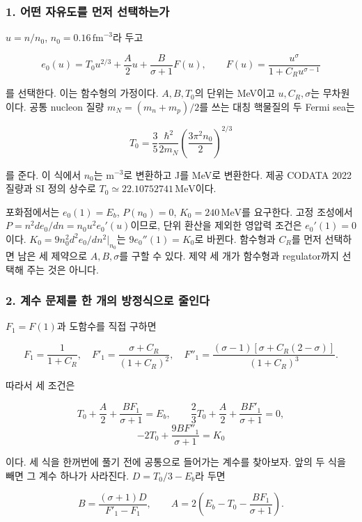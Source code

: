 \documentclass[
  10pt,
  a4paper,
]{article}
\begin{document}
\subsubsection{1. 어떤 자유도를 먼저
선택하는가}\label{uxc5b4uxb5a4-uxc790uxc720uxb3c4uxb97c-uxba3cuxc800-uxc120uxd0dduxd558uxb294uxac00}

\(u=n/n_0\), \(n_0=0.16\,\mathrm{fm}^{-3}\)라 두고

\[
e_0(u)=T_0u^{2/3}+\frac A2u+\frac{B}{\sigma+1}F(u),
\qquad F(u)=\frac{u^\sigma}{1+C_Ru^{\sigma-1}}
\]

를 선택한다. 이는 함수형의 가정이다. \(A,B,T_0\)의 단위는 MeV이고
\(u,C_R,\sigma\)는 무차원이다. 공통 nucleon 질량 \(m_N=(m_n+m_p)/2\)를
쓰는 대칭 핵물질의 두 Fermi sea는

\[
T_0=\frac35\frac{\hbar^2}{2m_N}
\left(\frac{3\pi^2 n_0}{2}\right)^{2/3}
\]

를 준다. 이 식에서 \(n_0\)는 \(\mathrm{m}^{-3}\)로 변환하고 J를 MeV로
변환한다. 제공 CODATA 2022 질량과 SI 정의 상수로
\(T_0\simeq22.10752741\,\mathrm{MeV}\)이다.

포화점에서는 \(e_0(1)=E_b\), \(P(n_0)=0\), \(K_0=240\,\mathrm{MeV}\)를
요구한다. 고정 조성에서 \(P=n^2de_0/dn=n_0u^2e_0'(u)\)이므로, 단위
환산을 제외한 영압력 조건은 \(e_0'(1)=0\)이다.
\(K_0=9n_0^2d^2e_0/dn^2|_{n_0}\)는 \(9e_0''(1)=K_0\)로 바뀐다. 함수형과
\(C_R\)를 먼저 선택하면 남은 세 제약으로 \(A,B,\sigma\)를 구할 수 있다.
제약 세 개가 함수형과 regulator까지 선택해 주는 것은 아니다.

\subsubsection{2. 계수 문제를 한 개의 방정식으로
줄인다}\label{uxacc4uxc218-uxbb38uxc81cuxb97c-uxd55c-uxac1cuxc758-uxbc29uxc815uxc2dduxc73cuxb85c-uxc904uxc778uxb2e4}

\(F_1=F(1)\)과 도함수를 직접 구하면

\[
F_1=\frac1{1+C_R},\quad
F'_1=\frac{\sigma+C_R}{(1+C_R)^2},\quad
F''_1=\frac{(\sigma-1)[\sigma+C_R(2-\sigma)]}{(1+C_R)^3}.
\]

따라서 세 조건은

\[
T_0+\frac A2+\frac{BF_1}{\sigma+1}=E_b,
\qquad \frac23T_0+\frac A2+\frac{BF'_1}{\sigma+1}=0,
\] \[
-2T_0+\frac{9BF''_1}{\sigma+1}=K_0
\]

이다. 세 식을 한꺼번에 풀기 전에 공통으로 들어가는 계수를 찾아보자. 앞의
두 식을 빼면 그 계수 하나가 사라진다. \(D=T_0/3-E_b\)라 두면

\[
B=\frac{(\sigma+1)D}{F'_1-F_1},\qquad
A=2\left(E_b-T_0-\frac{BF_1}{\sigma+1}\right).
\]
\end{document}
